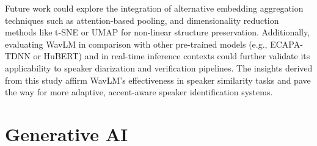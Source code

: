 \documentclass[conference]{IEEEtran}
\begin{document}
	Future work could explore the integration of alternative embedding aggregation techniques such as attention-based pooling, and dimensionality reduction methods like t-SNE or UMAP for non-linear structure preservation. Additionally, evaluating WavLM in comparison with other pre-trained models (e.g., ECAPA-TDNN or HuBERT) and in real-time inference contexts could further validate its applicability to speaker diarization and verification pipelines. The insights derived from this study affirm WavLM's effectiveness in speaker similarity tasks and pave the way for more adaptive, accent-aware speaker identification systems.
	
	\section*{Generative AI}
	
	\printbibliography
	
	
	
\end{document}
